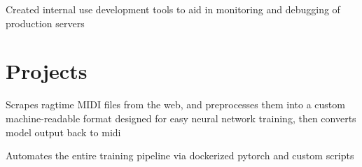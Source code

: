 \documentclass[letterpaper]{deedy-resume} %
\begin{document}
\begin{minipage}[t]{0.66\textwidth}
\sectionspace %


\vspace{1mm} %
\vspace{1mm} %

\begin{tightitemize}
    \item Created internal use development tools to aid in monitoring and 
        debugging of production servers
\end{tightitemize}

\sectionspace %


\section{Projects}


\vspace{1mm} %

\begin{tightitemize}
    \item Scrapes ragtime MIDI files from the web, and preprocesses them into a 
        custom machine-readable format designed for easy neural network 
        training, then converts model output back to midi
    \item Automates the entire training pipeline via dockerized pytorch and 
        custom scripts
\end{tightitemize}
\sectionspace


\end{minipage}
\end{document}
